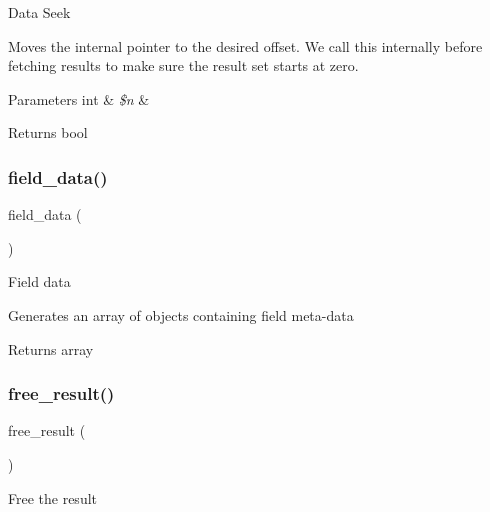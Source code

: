Data Seek

Moves the internal pointer to the desired offset. We call this internally before fetching results to make sure the result set starts at zero.


\begin{DoxyParams}[1]{Parameters}
int & {\em \$n} & \\
\hline
\end{DoxyParams}
\begin{DoxyReturn}{Returns}
bool 
\end{DoxyReturn}
\mbox{\label{class_c_i___d_b__mysql__result_a84bffd65e53902ade1591716749a33e3}} 
\subsubsection{\texorpdfstring{field\+\_\+data()}{field\_data()}}
{\footnotesize\ttfamily field\+\_\+data (\begin{DoxyParamCaption}{ }\end{DoxyParamCaption})}

Field data

Generates an array of objects containing field meta-\/data

\begin{DoxyReturn}{Returns}
array 
\end{DoxyReturn}
\mbox{\label{class_c_i___d_b__mysql__result_aad2d98d6beb3d6095405356c6107b473}} 
\subsubsection{\texorpdfstring{free\+\_\+result()}{free\_result()}}
{\footnotesize\ttfamily free\+\_\+result (\begin{DoxyParamCaption}{ }\end{DoxyParamCaption})}

Free the result

